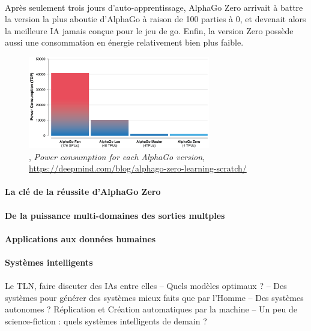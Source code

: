\paragraph{} Après seulement trois jours d'auto-apprentissage, AlphaGo Zero arrivait à battre la version la plus aboutie d'AlphaGo à raison de 100 parties à 0,
et devenait alors la meilleure IA jamais conçue pour le jeu de go. Enfin, la version Zero possède aussi une consommation en énergie relativement
bien plus faible.

\begin{figure}[h]
    \centering
    \includegraphics[width=300px]{chapters/03/images/alphago-consumption.png}
    \caption{\label{comparatif}, \emph{Power consumption for each AlphaGo version}, \url{https://deepmind.com/blog/alphago-zero-learning-scratch/}}
\end{figure}

\paragraph{La clé de la réussite d'AlphaGo Zero}

\paragraph{De la puissance multi-domaines des sorties multples}

\paragraph{Applications aux données humaines}

\paragraph{Systèmes intelligents}

\paragraph{} Le TLN, faire discuter des IAs entre elles -- Quels modèles optimaux ? -- Des systèmes pour
générer des systèmes mieux faits que par l'Homme -- Des systèmes autonomes ? Réplication et Création
automatiques par la machine -- Un peu de science-fiction : quels systèmes intelligents de demain ?
